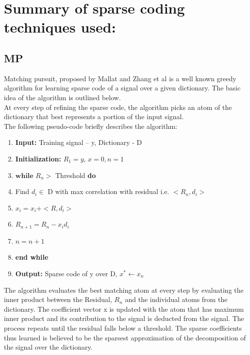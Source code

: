 \documentclass{article} %
\begin{document}
\section{Summary of sparse coding techniques used:}

\subsection{MP}
  Matching pursuit, proposed by Mallat and Zhang et al \citep{mallat1993matching} is a well known greedy algorithm for learning sparse code of a signal over a given dictionary. The basic idea of the algorithm is outlined below.\\ 
At every step of refining the sparse code, the algorithm picks an atom of the dictionary that best represents a portion of the input signal. \\

The following pseudo-code briefly describes the algorithm:\\


\begin{enumerate}
\item \textbf{Input:} Training signal – y, Dictionary - D
\item \textbf{Initialization:} $R_1=y$, $x=0, n=1$
\item $\textbf{while}$ $R_n >$ Threshold \textbf{do}
\item \hspace*{.4cm} Find $d_i \in $ D with max correlation with residual i.e. $<R_n,d_i>$
\item \hspace*{.4cm} $x_i=x_i+<R,d_i>$
\item \hspace*{.4cm} $R_{n+1}=R_n-x_id_i$
\item \hspace*{.4cm} $n=n+1$
\item \textbf{end while}
\item \textbf{Output: }Sparse code of y over D, $x^* \leftarrow x_n$
\end{enumerate}

           The algorithm evaluates the best matching atom at every step by evaluating the inner product between the Residual, $R_n$ and the individual atoms from the dictionary. The coefficient vector x is updated with the atom that has maximum inner product and its contribution to the signal is deducted from the signal. The process repeats until the residual falls below a threshold. The sparse coefficients thus learned is believed to be the sparsest approximation of the decomposition of the signal over the dictionary.
\end{document}
